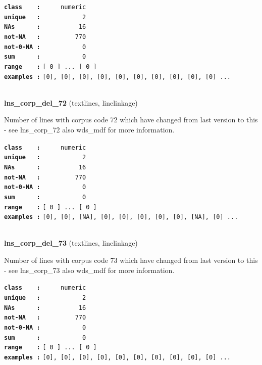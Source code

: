 \documentclass[]{article}
\begin{document}
\textbf{\texttt{class\ \ \ \ :}} \texttt{~~~~~numeric}\\
\textbf{\texttt{unique\ \ \ :}} \texttt{~~~~~~~~~~~2}\\
\textbf{\texttt{NAs\ \ \ \ \ \ :}} \texttt{~~~~~~~~~~16}\\
\textbf{\texttt{not-NA\ \ \ :}} \texttt{~~~~~~~~~770}\\
\textbf{\texttt{not-0-NA\ :}} \texttt{~~~~~~~~~~~0}\\
\textbf{\texttt{sum\ \ \ \ \ \ :}} \texttt{~~~~~~~~~~~0}\\
\textbf{\texttt{range\ \ \ \ :}}
\texttt{{[}\ 0\ {]}\ ...\ {[}\ 0\ {]}}\\
\textbf{\texttt{examples\ :}}
\texttt{{[}0{]},\ {[}0{]},\ {[}0{]},\ {[}0{]},\ {[}0{]},\ {[}0{]},\ {[}0{]},\ {[}0{]},\ {[}0{]},\ {[}0{]}\ ...}\\

~

\textbf{lns\_corp\_del\_72} (textlines, linelinkage)

Number of lines with corpus code 72 which have changed from last version
to this - see lns\_corp\_72 also wds\_mdf for more information.

\textbf{\texttt{class\ \ \ \ :}} \texttt{~~~~~numeric}\\
\textbf{\texttt{unique\ \ \ :}} \texttt{~~~~~~~~~~~2}\\
\textbf{\texttt{NAs\ \ \ \ \ \ :}} \texttt{~~~~~~~~~~16}\\
\textbf{\texttt{not-NA\ \ \ :}} \texttt{~~~~~~~~~770}\\
\textbf{\texttt{not-0-NA\ :}} \texttt{~~~~~~~~~~~0}\\
\textbf{\texttt{sum\ \ \ \ \ \ :}} \texttt{~~~~~~~~~~~0}\\
\textbf{\texttt{range\ \ \ \ :}}
\texttt{{[}\ 0\ {]}\ ...\ {[}\ 0\ {]}}\\
\textbf{\texttt{examples\ :}}
\texttt{{[}0{]},\ {[}0{]},\ {[}NA{]},\ {[}0{]},\ {[}0{]},\ {[}0{]},\ {[}0{]},\ {[}0{]},\ {[}NA{]},\ {[}0{]}\ ...}\\

~

\textbf{lns\_corp\_del\_73} (textlines, linelinkage)

Number of lines with corpus code 73 which have changed from last version
to this - see lns\_corp\_73 also wds\_mdf for more information.

\textbf{\texttt{class\ \ \ \ :}} \texttt{~~~~~numeric}\\
\textbf{\texttt{unique\ \ \ :}} \texttt{~~~~~~~~~~~2}\\
\textbf{\texttt{NAs\ \ \ \ \ \ :}} \texttt{~~~~~~~~~~16}\\
\textbf{\texttt{not-NA\ \ \ :}} \texttt{~~~~~~~~~770}\\
\textbf{\texttt{not-0-NA\ :}} \texttt{~~~~~~~~~~~0}\\
\textbf{\texttt{sum\ \ \ \ \ \ :}} \texttt{~~~~~~~~~~~0}\\
\textbf{\texttt{range\ \ \ \ :}}
\texttt{{[}\ 0\ {]}\ ...\ {[}\ 0\ {]}}\\
\textbf{\texttt{examples\ :}}
\texttt{{[}0{]},\ {[}0{]},\ {[}0{]},\ {[}0{]},\ {[}0{]},\ {[}0{]},\ {[}0{]},\ {[}0{]},\ {[}0{]},\ {[}0{]}\ ...}\\
\end{document}
